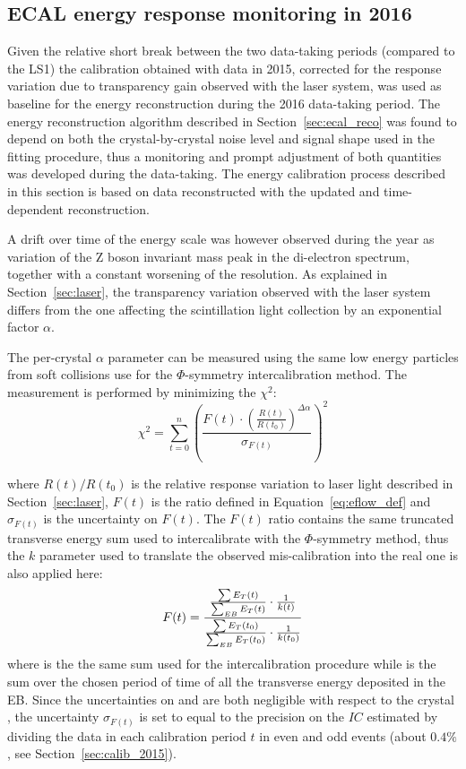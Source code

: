 \subsection{ECAL energy response monitoring in 2016}
\label{sec:calib_2016}
Given the relative short break between the two data-taking periods (compared to the LS1)
the calibration obtained with data in 2015, corrected for the response variation
due to transparency gain observed with the laser system, was used as baseline
for the energy reconstruction during the 2016 data-taking period.
The energy reconstruction algorithm described in Section~\ref{sec:ecal_reco} was found to depend on both
the crystal-by-crystal noise level and signal shape used in the fitting procedure, thus a monitoring and prompt adjustment
of both quantities was developed during the data-taking. The energy calibration process described in this section
is based on data reconstructed with the updated and time-dependent reconstruction. 

A drift over time of the energy scale was however observed during the year as variation of the Z boson
invariant mass peak in the di-electron spectrum, together with a constant worsening of the resolution.
As explained in Section~\ref{sec:laser}, the transparency variation observed with the laser system differs
from the one affecting the scintillation light collection by an exponential factor $\alpha$.

The per-crystal $\alpha$ parameter can be measured using the same low energy particles from soft collisions
use for the $\Phi$-symmetry intercalibration method. The measurement is performed by minimizing the $\chi^2$:
\begin{equation}
  \chi^2 = \sum_{t=0}^n \left( \frac{F(t) \cdot \left(\frac{R(t)}{R(t_0)}\right)^{\Delta\alpha}}{\sigma_{F(t)}} \right)^2
\end{equation}
\label{eq:chi2_fit_alpha}

where $R(t)/R(t_0)$ is the relative response variation to laser light described in Section~\ref{sec:laser},
$F(t)$ is the ratio defined in Equation~\ref{eq:eflow_def} and $\sigma_{F(t)}$ is the uncertainty on $F(t)$.
The $F(t)$ ratio contains the same truncated transverse energy sum used to intercalibrate with the $\Phi$-symmetry method, thus
the $k$ parameter used to translate the observed mis-calibration into the real one is also applied here:
\begin{equation}
F(t) = \frac{ \frac{\sum E_T(t)}{\sum_{EB} E_T(t)}  \cdot \frac{1}{k(t)}} { \frac{\sum E_T(t_0)}{\sum_{EB} E_T(t_0)}  \cdot \frac{1}{k(t_0)}}
\end{equation}
\label{eq:eflow_def}
where \sumEt is the the same sum used for the intercalibration procedure while \sumEtEB is the sum over the chosen period of time
of all the transverse energy deposited in the EB.
Since the uncertainties on \sumEtEB and \sumEtring are both negligible with respect to the crystal \sumEt,
the uncertainty $\sigma_{F(t)}$ is set to equal to the precision on the $IC$ estimated by dividing the data in each calibration
period $t$ in even and odd events (about $0.4\%$, see Section~\ref{sec:calib_2015}).

